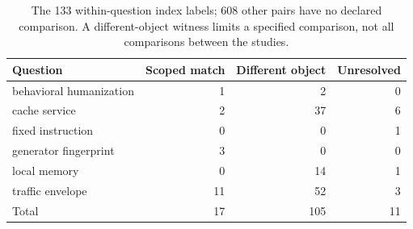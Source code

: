 \begin{table}[t]\centering\footnotesize
\caption{The 133 within-question index labels; 608 other pairs have no declared comparison. A different-object witness limits a specified comparison, not all comparisons between the studies.}\label{tab:r33-pairs}
\begin{tabularx}{\columnwidth}{@{}Yrrr@{}}\toprule
Question & Scoped match & Different object & Unresolved\\\midrule
behavioral humanization & 1 & 2 & 0\\
cache service & 2 & 37 & 6\\
fixed instruction & 0 & 0 & 1\\
generator fingerprint & 3 & 0 & 0\\
local memory & 0 & 14 & 1\\
traffic envelope & 11 & 52 & 3\\
\midrule Total & 17 & 105 & 11\\\bottomrule\end{tabularx}\end{table}
